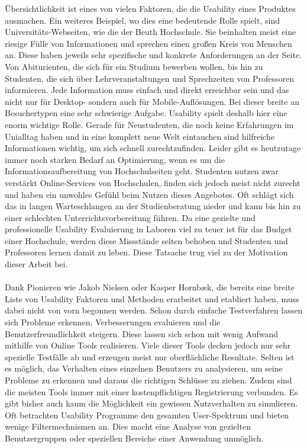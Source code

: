 Übersichtlichkeit ist eines von vielen Faktoren, die die Usability eines Produktes ausmachen. Ein weiteres Beispiel, wo dies eine bedeutende Rolle spielt, sind Universitäts-Webseiten, wie die der Beuth Hochschule. Sie beinhalten meist eine riesige Fülle von Informationen und sprechen einen großen Kreis von Menschen an. Diese haben jeweils sehr spezifische und konkrete Anforderungen an der Seite. Von Abiturienten, die sich für ein Studium bewerben wollen, bis hin zu Studenten, die sich über Lehrveranstaltungen und Sprechzeiten von Professoren informieren. Jede Information muss einfach und direkt erreichbar sein und das nicht nur für Desktop- sondern auch für Mobile-Auflösungen. Bei dieser breite an Besuchertypen eine sehr schwierige Aufgabe. Usability spielt deshalb hier eine enorm wichtige Rolle. Gerade für Neustudenten, die noch keine Erfahrungen im Unialltag haben und in eine komplett neue Welt eintauchen sind hilfreiche Informationen wichtig, um sich schnell zurechtzufinden. Leider gibt es heutzutage immer noch starken Bedarf an Optimierung, wenn es um die Informationsaufbereitung von Hochschulseiten geht. Studenten nutzen zwar verstärkt Online-Services von Hochschulen, finden sich jedoch meist nicht zurecht und haben ein unwohles Gefühl beim Nutzen dieses Angebotes. Oft schlägt sich das in langen Warteschlangen an der Studienberatung nieder und kann bis hin zu einer schlechten Unterrichtsvorbereitung führen. Da eine gezielte und professionelle Usability Evaluierung in Laboren viel zu teuer ist für das Budget einer Hochschule, werden diese Missstände selten behoben und Studenten und Professoren lernen damit zu leben. Diese Tatsache trug viel zu der Motivation dieser Arbeit bei.\\
\\
Dank Pionieren wie Jakob Nielsen oder Kasper Hornbæk, die bereits eine breite Liste von Usability Faktoren und Methoden erarbeitet und etabliert haben, muss dabei nicht von vorn begonnen werden. Schon durch einfache Testverfahren lassen sich Probleme erkennen, Verbesserungen evaluieren und die Benutzerfreundlichkeit steigern. Diese lassen sich schon mit wenig Aufwand mithilfe von Online Tools realisieren. Viele dieser Tools decken jedoch nur sehr spezielle Testfälle ab und erzeugen meist nur oberflächliche Resultate. Selten ist es möglich, das Verhalten eines einzelnen Benutzers zu analysieren, um seine Probleme zu erkennen und daraus die richtigen Schlüsse zu ziehen. Zudem sind die meisten Tools immer mit einer kostenpflichtigen Registrierung verbunden. Es gibt bisher auch kaum die Möglichkeit ein gewissen Nutzverhalten zu simulieren. Oft betrachten Usability Programme den gesamten User-Spektrum und bieten wenige Filtermechnismen an. Dies macht eine Analyse von gezielten Benutzergruppen oder speziellen Bereiche einer Anwendung unmöglich.\\
